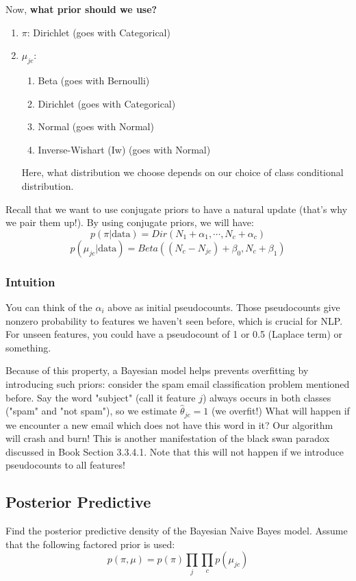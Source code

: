 \documentclass{article}
\begin{document}
Now, \textbf{what prior should we use?}
\begin{enumerate}
    \item $\pi$: Dirichlet (goes with Categorical)
    \item $\mu_{jc}$: 
        \begin{enumerate}
            \item Beta (goes with Bernoulli)
            \item Dirichlet (goes with Categorical)
            \item Normal (goes with Normal)
            \item Inverse-Wishart (Iw) (goes with Normal)
        \end{enumerate}
        Here, what distribution we choose depends on our choice of class conditional distribution.
\end{enumerate} 
Recall that we want to use conjugate priors to have a natural update (that's why we pair them up!). By using conjugate priors, we will have:
    \[ p(\pi | \text{data}) = Dir(N_1 + \alpha_1, \cdots, N_c + \alpha_c) \]
    \[ p(\mu_{jc} | \text{data}) = Beta((N_c - N_{jc}) + \beta_0, N_c + \beta_1) \]
\subsubsection{Intuition}
You can think of the $\alpha_i$ above as initial pseudocounts. Those pseudocounts give nonzero probability to features we haven't seen before, which is crucial for NLP. For unseen features, you could have a pseudocount of 1 or 0.5 (Laplace term) or something. 

Because of this property, a Bayesian model helps prevents overfitting by introducing such priors: consider the spam email classification problem mentioned before. Say the word "subject" (call it feature $j$) always occurs in both classes ("spam" and "not spam"), so we estimate $\hat{\theta}_{jc} = 1$ (we overfit!) What will happen if we encounter a new email which does not have this word in it? Our algorithm will crash and burn! This is another manifestation of the black swan paradox discussed in Book Section 3.3.4.1. Note that this will not happen if we introduce pseudocounts to all features! 
\subsection{Posterior Predictive}

\begin{exercise} 
Find the posterior predictive density of the Bayesian Naive Bayes model. Assume that the following factored prior is used: 
\[p(\pi, \mu) = p(\pi) \prod_j \prod_c p(\mu_{jc})\] \end{exercise}
\end{document}

